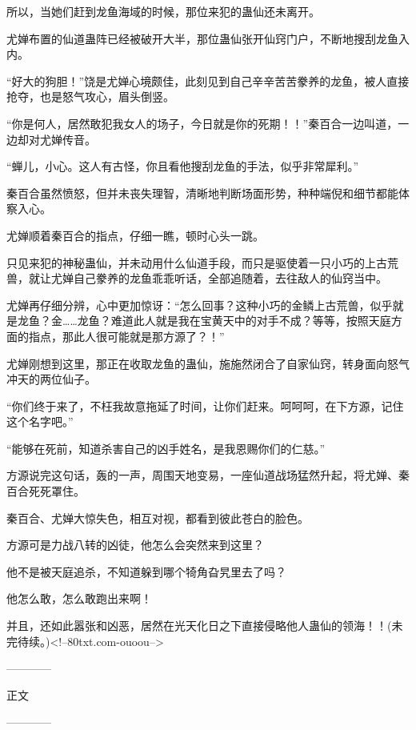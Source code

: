 \begin{this_body}
所以，当她们赶到龙鱼海域的时候，那位来犯的蛊仙还未离开。

尤婵布置的仙道蛊阵已经被破开大半，那位蛊仙张开仙窍门户，不断地搜刮龙鱼入内。

“好大的狗胆！”饶是尤婵心境颇佳，此刻见到自己辛辛苦苦豢养的龙鱼，被人直接抢夺，也是怒气攻心，眉头倒竖。

“你是何人，居然敢犯我女人的场子，今日就是你的死期！！”秦百合一边叫道，一边却对尤婵传音。

“蝉儿，小心。这人有古怪，你且看他搜刮龙鱼的手法，似乎非常犀利。”

秦百合虽然愤怒，但并未丧失理智，清晰地判断场面形势，种种端倪和细节都能体察入心。

尤婵顺着秦百合的指点，仔细一瞧，顿时心头一跳。

只见来犯的神秘蛊仙，并未动用什么仙道手段，而只是驱使着一只小巧的上古荒兽，就让尤婵自己豢养的龙鱼乖乖听话，全部追随着，去往敌人的仙窍当中。

尤婵再仔细分辨，心中更加惊讶：“怎么回事？这种小巧的金鳞上古荒兽，似乎就是龙鱼？金……龙鱼？难道此人就是我在宝黄天中的对手不成？等等，按照天庭方面的指点，那此人很可能就是那方源了？！”

尤婵刚想到这里，那正在收取龙鱼的蛊仙，施施然闭合了自家仙窍，转身面向怒气冲天的两位仙子。

“你们终于来了，不枉我故意拖延了时间，让你们赶来。呵呵呵，在下方源，记住这个名字吧。”

“能够在死前，知道杀害自己的凶手姓名，是我恩赐你们的仁慈。”

方源说完这句话，轰的一声，周围天地变易，一座仙道战场猛然升起，将尤婵、秦百合死死罩住。

秦百合、尤婵大惊失色，相互对视，都看到彼此苍白的脸色。

方源可是力战八转的凶徒，他怎么会突然来到这里？

他不是被天庭追杀，不知道躲到哪个犄角旮旯里去了吗？

他怎么敢，怎么敢跑出来啊！

并且，还如此嚣张和凶恶，居然在光天化日之下直接侵略他人蛊仙的领海！！(未完待续。)<!--80txt.com-ouoou-->

------------

正文

------------

\end{this_body}

